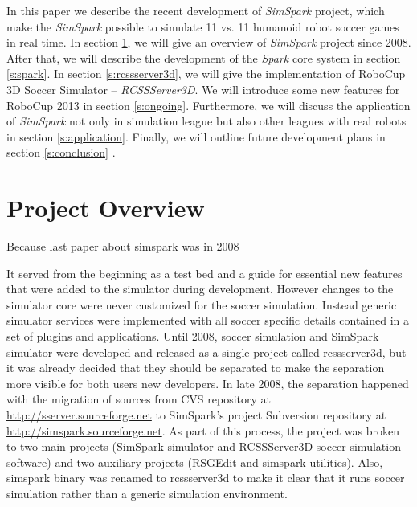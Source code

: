 \documentclass{llncs}
\begin{document}
In this paper we describe the recent development of \textit{SimSpark} project, which make the \textit{SimSpark} possible to simulate 11 vs. 11 humanoid robot soccer games in real time.
In section \ref{s:overview}, we will give an overview of \textit{SimSpark} project since 2008. After that, we will describe the development of the \textit{Spark} core system in section \ref{s:spark}.
In section \ref{s:rcssserver3d}, we will give the implementation of RoboCup 3D Soccer Simulator -- \textit{RCSSServer3D}.
We will introduce some new features for RoboCup 2013 in section \ref{s:ongoing}.
Furthermore, we will discuss the application of \textit{SimSpark} not only in simulation league but also other leagues with real robots in section \ref{s:application}.
Finally, we will outline future development plans in section \ref{s:conclusion} .



\section{Project Overview}
\label{s:overview}
Because last paper about simspark was in 2008

It served from the beginning as a test bed and a guide for essential new features that were added to the simulator during development. However changes to the simulator core were never customized for the soccer simulation. Instead generic simulator services were implemented with all soccer specific details contained in a set of plugins and applications. Until 2008, soccer simulation and SimSpark simulator were developed and released as a single project called rcssserver3d, but it was already decided that they should be separated 
to make the separation more visible for both users new developers. 
In late 2008, the separation happened with the migration of sources from CVS repository
at \url{http://sserver.sourceforge.net} to SimSpark's project Subversion repository at 
\url{http://simspark.sourceforge.net}. As part of this process, the project was broken
to two main projects (SimSpark simulator and RCSSServer3D soccer simulation software) 
and two auxiliary projects (RSGEdit and simspark-utilities). Also, simspark binary was 
renamed to rcssserver3d to make it clear that it runs soccer simulation rather than a 
generic simulation environment.
\end{document}
